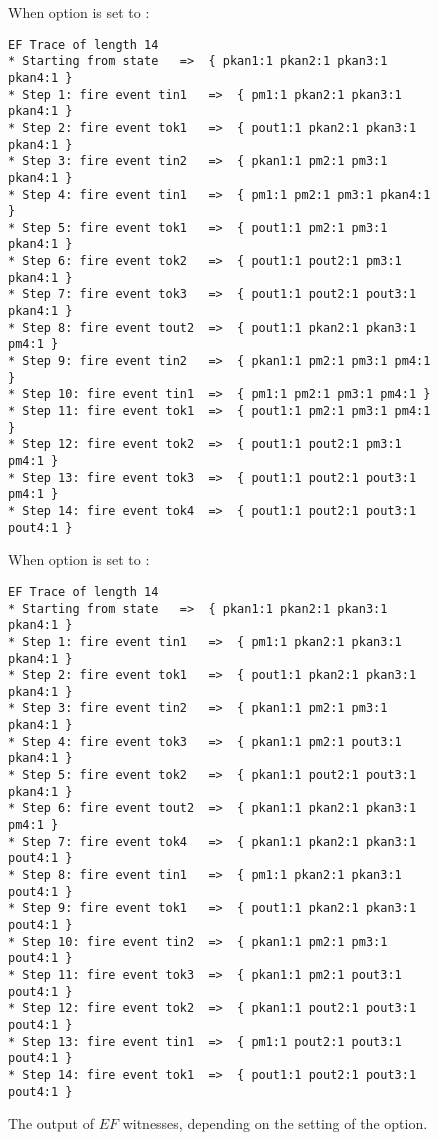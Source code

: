 \begin{developer}
\begin{figure}
When option  is set to :
\begin{lstlisting}
EF Trace of length 14
* Starting from state 	=>  { pkan1:1 pkan2:1 pkan3:1 pkan4:1 }
* Step 1: fire event tin1	=>  { pm1:1 pkan2:1 pkan3:1 pkan4:1 }
* Step 2: fire event tok1	=>  { pout1:1 pkan2:1 pkan3:1 pkan4:1 }
* Step 3: fire event tin2	=>  { pkan1:1 pm2:1 pm3:1 pkan4:1 }
* Step 4: fire event tin1	=>  { pm1:1 pm2:1 pm3:1 pkan4:1 }
* Step 5: fire event tok1	=>  { pout1:1 pm2:1 pm3:1 pkan4:1 }
* Step 6: fire event tok2	=>  { pout1:1 pout2:1 pm3:1 pkan4:1 }
* Step 7: fire event tok3	=>  { pout1:1 pout2:1 pout3:1 pkan4:1 }
* Step 8: fire event tout2	=>  { pout1:1 pkan2:1 pkan3:1 pm4:1 }
* Step 9: fire event tin2	=>  { pkan1:1 pm2:1 pm3:1 pm4:1 }
* Step 10: fire event tin1	=>  { pm1:1 pm2:1 pm3:1 pm4:1 }
* Step 11: fire event tok1	=>  { pout1:1 pm2:1 pm3:1 pm4:1 }
* Step 12: fire event tok2	=>  { pout1:1 pout2:1 pm3:1 pm4:1 }
* Step 13: fire event tok3	=>  { pout1:1 pout2:1 pout3:1 pm4:1 }
* Step 14: fire event tok4	=>  { pout1:1 pout2:1 pout3:1 pout4:1 }
\end{lstlisting}

When option  is set to :
\begin{lstlisting}
EF Trace of length 14
* Starting from state 	=>  { pkan1:1 pkan2:1 pkan3:1 pkan4:1 }
* Step 1: fire event tin1	=>  { pm1:1 pkan2:1 pkan3:1 pkan4:1 }
* Step 2: fire event tok1	=>  { pout1:1 pkan2:1 pkan3:1 pkan4:1 }
* Step 3: fire event tin2	=>  { pkan1:1 pm2:1 pm3:1 pkan4:1 }
* Step 4: fire event tok3	=>  { pkan1:1 pm2:1 pout3:1 pkan4:1 }
* Step 5: fire event tok2	=>  { pkan1:1 pout2:1 pout3:1 pkan4:1 }
* Step 6: fire event tout2	=>  { pkan1:1 pkan2:1 pkan3:1 pm4:1 }
* Step 7: fire event tok4	=>  { pkan1:1 pkan2:1 pkan3:1 pout4:1 }
* Step 8: fire event tin1	=>  { pm1:1 pkan2:1 pkan3:1 pout4:1 }
* Step 9: fire event tok1	=>  { pout1:1 pkan2:1 pkan3:1 pout4:1 }
* Step 10: fire event tin2	=>  { pkan1:1 pm2:1 pm3:1 pout4:1 }
* Step 11: fire event tok3	=>  { pkan1:1 pm2:1 pout3:1 pout4:1 }
* Step 12: fire event tok2	=>  { pkan1:1 pout2:1 pout3:1 pout4:1 }
* Step 13: fire event tin1	=>  { pm1:1 pout2:1 pout3:1 pout4:1 }
* Step 14: fire event tok1	=>  { pout1:1 pout2:1 pout3:1 pout4:1 }
\end{lstlisting}
\caption{The output of $EF$ witnesses, depending on the setting of the
 option.}
\label{FIG:TraceOutput}
\end{figure}

\end{developer}
